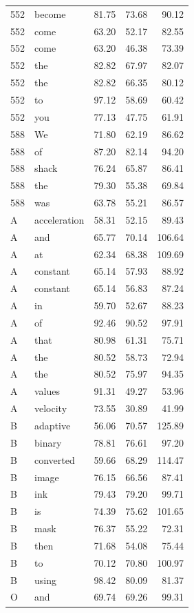 \begin{longtable}{llrrr}
552 & become & 81.75 & 73.68 & 90.12\\
552 & come & 63.20 & 52.17 & 82.55\\
552 & come & 63.20 & 46.38 & 73.39\\
552 & the & 82.82 & 67.97 & 82.07\\
552 & the & 82.82 & 66.35 & 80.12\\
552 & to & 97.12 & 58.69 & 60.42\\
552 & you & 77.13 & 47.75 & 61.91\\
588 & We & 71.80 & 62.19 & 86.62\\
588 & of & 87.20 & 82.14 & 94.20\\
588 & shack & 76.24 & 65.87 & 86.41\\
588 & the & 79.30 & 55.38 & 69.84\\
588 & was & 63.78 & 55.21 & 86.57\\
A & acceleration & 58.31 & 52.15 & 89.43\\
A & and & 65.77 & 70.14 & 106.64\\
A & at & 62.34 & 68.38 & 109.69\\
A & constant & 65.14 & 57.93 & 88.92\\
A & constant & 65.14 & 56.83 & 87.24\\
A & in & 59.70 & 52.67 & 88.23\\
A & of & 92.46 & 90.52 & 97.91\\
A & that & 80.98 & 61.31 & 75.71\\
A & the & 80.52 & 58.73 & 72.94\\
A & the & 80.52 & 75.97 & 94.35\\
A & values & 91.31 & 49.27 & 53.96\\
A & velocity & 73.55 & 30.89 & 41.99\\
B & adaptive & 56.06 & 70.57 & 125.89\\
B & binary & 78.81 & 76.61 & 97.20\\
B & converted & 59.66 & 68.29 & 114.47\\
B & image & 76.15 & 66.56 & 87.41\\
B & ink & 79.43 & 79.20 & 99.71\\
B & is & 74.39 & 75.62 & 101.65\\
B & mask & 76.37 & 55.22 & 72.31\\
B & then & 71.68 & 54.08 & 75.44\\
B & to & 70.12 & 70.80 & 100.97\\
B & using & 98.42 & 80.09 & 81.37\\
O & and & 69.74 & 69.26 & 99.31\\

\end{longtable}
